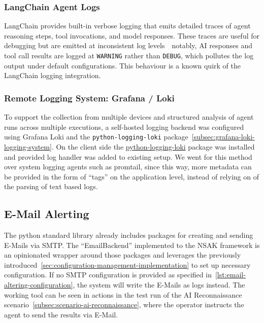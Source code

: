 \subsubsection{LangChain Agent Logs}\label{subsubsec:ai-scenarios-implementation-langchain-agent-logs}

LangChain provides built-in verbose logging that emits detailed traces of agent reasoning steps, tool invocations, and model responses.
These traces are useful for debugging but are emitted at inconsistent log levels~\textthreequartersemdash~notably,
\gls{AI} responses and tool call results are logged at \texttt{WARNING} rather than \texttt{DEBUG},
which pollutes the log output under default configurations.
This behaviour is a known quirk of the LangChain logging integration.

\subsubsection{Remote Logging System: Grafana / Loki}\label{subsubsec:ai-scenarios-implementation-remote-logging-system}

To support the collection from multiple devices and
structured analysis of agent runs across multiple executions,
a self-hosted logging backend was configured using Grafana Loki and the \texttt{python-logging-loki} package~\ref{subsec:grafana-loki-logging-system}.
On the client side the \href{https://pypi.org/project/python-logging-loki/}{python-logging-loki} package was installed
and provided log handler was added to existing setup.
We went for this method over system logging agents such as promtail,
since this way,
more metadata can be provided in the form of \enquote{tags} on the application level,
instead of relying on of the parsing of text based logs.

\subsection{E-Mail Alerting}\label{subsec:ai-scenarios-implementation-e-mail-alerting}

The python standard library already includes packages for creating and sending E-Mails via \gls{SMTP}.
The \enquote{EmailBackend} implemented to the \gls{NSAK} framework is an opinionated wrapper around those packages
and leverages the previously introduced~\ref{sec:configuration-management-implementation} to set up necessary configuration.
If no \gls{SMTP} configuration is provided as specified in~\ref{lst:email-altering-configuration},
the system will write the E-Mails as logs instead.
The working tool can be seen in actions in the test run of the \gls{AI} Reconnaissance scenario~\ref{subsec:scenario-ai-reconnaissance},
where the operator instructs the agent to send the results via E-Mail.


